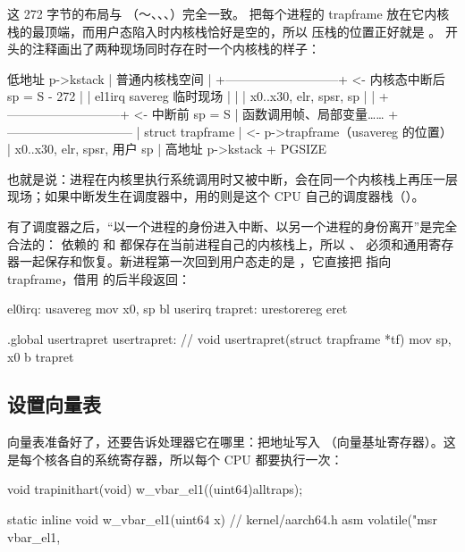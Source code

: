 这 272 字节的布局与 （～、、、）完全一致。 把每个进程的 trapframe 放在它内核栈的最顶端，而用户态陷入时内核栈恰好是空的，所以  压栈的位置正好就是 。 开头的注释画出了两种现场同时存在时一个内核栈的样子：

\begin{txtcode}
低地址   p->kstack
           |  普通内核栈空间
           |  +---------------------------+  <- 内核态中断后 sp = S - 272
           |  | el1irq savereg 临时现场   |
           |  | x0..x30, elr, spsr, sp    |
           |  +---------------------------+  <- 中断前 sp = S
           |  函数调用帧、局部变量……
           +------------------------------
           |  struct trapframe            |  <- p->trapframe（usavereg 的位置）
           |  x0..x30, elr, spsr, 用户 sp |
高地址   p->kstack + PGSIZE
\end{txtcode}

也就是说：进程在内核里执行系统调用时又被中断，会在同一个内核栈上再压一层  现场；如果中断发生在调度器中，用的则是这个 CPU 自己的调度器栈（）。

有了调度器之后，“以一个进程的身份进入中断、以另一个进程的身份离开”是完全合法的： 依赖的  和  都保存在当前进程自己的内核栈上，所以 、 必须和通用寄存器一起保存和恢复。新进程第一次回到用户态走的是 ，它直接把  指向 trapframe，借用  的后半段返回：

\begin{asmcode}
el0irq:
        usavereg
        mov x0, sp
        bl userirq
trapret:
        urestorereg
        eret

.global usertrapret
usertrapret:                    // void usertrapret(struct trapframe *tf)
        mov sp, x0
        b trapret
\end{asmcode}

\subsection{设置向量表}

向量表准备好了，还要告诉处理器它在哪里：把地址写入 （向量基址寄存器）。这是每个核各自的系统寄存器，所以每个 CPU 都要执行一次：

\begin{ccode}
void trapinithart(void)
{
  w_vbar_el1((uint64)alltraps);
}

static inline void w_vbar_el1(uint64 x)     // kernel/aarch64.h
{
  asm volatile("msr vbar_el1, %
}
\end{ccode}

